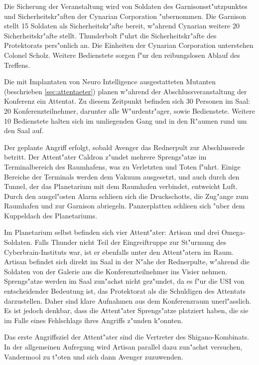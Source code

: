Die Sicherung der Veranstaltung wird von Soldaten des Garnisonsst"utzpunktes und Sicherheitskr"aften der Cynarian Corporation "ubernommen. Die Garnison stellt 15 Soldaten als Sicherheitskr"afte bereit, w"ahrend Cynarian weitere 20 Sicherheitskr"afte stellt. Thunderbolt f"uhrt die Sicherheitskr"afte des Protektorats pers"onlich an. Die Einheiten der Cynarian Corporation unterstehen Colonel Scholz. Weitere Bedienstete sorgen f"ur den reibungslosen Ablauf des Treffens.


Die mit Implantaten von Neuro Intelligence ausgestatteten Mutanten (beschrieben \cref{sec:attentaeter}) planen w"ahrend der Abschlussveranstaltung der Konferenz ein Attentat. Zu diesem Zeitpunkt befinden sich 30 Personen im Saal: 20 Konferenzteilnehmer, darunter alle W"urdentr"ager, sowie Bedienstete. Weitere 10 Bedienstete halten sich im umliegenden Gang und in den R"aumen rund um den Saal auf.

Der geplante Angriff erfolgt, sobald Avenger das Rednerpult zur Abschlussrede betritt. Der Attent"ater Caldron z"undet mehrere Sprengs"atze im Terminalbereich des Raumhafens, was zu Verletzten und Toten f"uhrt. Einige Bereiche der Terminals werden dem Vakuum ausgesetzt, und auch durch den Tunnel, der das Planetarium mit dem Raumhafen verbindet, entweicht Luft. Durch den ausgel"osten Alarm schlie\3en sich die Druckschotts, die Zug"ange zum Raumhafen und zur Garnison abriegeln. Panzerplatten schlie\3en sich "uber dem Kuppeldach des Planetariums.

Im Planetarium selbst befinden sich vier Attent"ater: Artisan und drei Omega-Soldaten. Falls Thunder nicht Teil der Eingreiftruppe zur St"urmung des Cyberbrain-Instituts war, ist er ebenfalls unter den Attent"atern im Raum. Artisan befindet sich direkt im Saal in der N"ahe der Rednerpulte, w"ahrend die Soldaten von der Galerie aus die Konferenzteilnehmer ins Visier nehmen. Sprengs"atze werden im Saal zun"achst nicht gez"undet, da es f"ur die USI von entscheidender Bedeutung ist, das Protektorat als die Schuldigen des Attentats darzustellen. Daher sind klare Aufnahmen aus dem Konferenzraum unerl"asslich. Es ist jedoch denkbar, dass die Attent"ater Sprengs"atze platziert haben, die sie im Falle eines Fehlschlags ihres Angriffs z"unden k"onnten.

Das erste Angriffsziel der Attent"ater sind die Vertreter des Shigano-Kombinats. In der allgemeinen Aufregung wird Artisan parallel dazu zun"achst versuchen, Vandermool zu t"oten und sich dann Avenger zuzuwenden.

